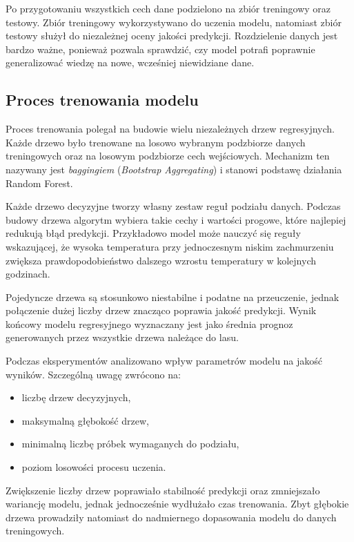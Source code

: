 \documentclass[a4paper,12pt]{article}
\begin{document}
\begin{table}[h]
\begin{table}[h]
\begin{table}[h]
\begin{table}[h]
\noindent
Po przygotowaniu wszystkich cech dane podzielono na zbiór treningowy oraz testowy. Zbiór treningowy wykorzystywano do uczenia modelu, natomiast zbiór testowy służył do niezależnej oceny jakości predykcji. Rozdzielenie danych jest bardzo ważne, ponieważ pozwala sprawdzić, czy model potrafi poprawnie generalizować wiedzę na nowe, wcześniej niewidziane dane.

\subsection{Proces trenowania modelu}

Proces trenowania polegał na budowie wielu niezależnych drzew regresyjnych. Każde drzewo było trenowane na losowo wybranym podzbiorze danych treningowych oraz na losowym podzbiorze cech wejściowych. Mechanizm ten nazywany jest \textit{baggingiem} (\textit{Bootstrap Aggregating}) i stanowi podstawę działania Random Forest.

\noindent
Każde drzewo decyzyjne tworzy własny zestaw reguł podziału danych. Podczas budowy drzewa algorytm wybiera takie cechy i wartości progowe, które najlepiej redukują błąd predykcji. Przykładowo model może nauczyć się reguły wskazującej, że wysoka temperatura przy jednoczesnym niskim zachmurzeniu zwiększa prawdopodobieństwo dalszego wzrostu temperatury w kolejnych godzinach.

\noindent
Pojedyncze drzewa są stosunkowo niestabilne i podatne na przeuczenie, jednak połączenie dużej liczby drzew znacząco poprawia jakość predykcji. Wynik końcowy modelu regresyjnego wyznaczany jest jako średnia prognoz generowanych przez wszystkie drzewa należące do lasu.

\noindent
Podczas eksperymentów analizowano wpływ parametrów modelu na jakość wyników. Szczególną uwagę zwrócono na:

\begin{itemize}
    \item liczbę drzew decyzyjnych,
    \item maksymalną głębokość drzew,
    \item minimalną liczbę próbek wymaganych do podziału,
    \item poziom losowości procesu uczenia.
\end{itemize}

\noindent
Zwiększenie liczby drzew poprawiało stabilność predykcji oraz zmniejszało wariancję modelu, jednak jednocześnie wydłużało czas trenowania. Zbyt głębokie drzewa prowadziły natomiast do nadmiernego dopasowania modelu do danych treningowych.


\end{table}
\end{table}
\end{table}
\end{table}
\end{document}
